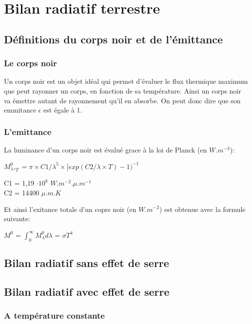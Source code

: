 \documentclass[a4paper, 12pt]{report} %
\begin{document}
\section{Bilan radiatif terrestre}
\subsection{Définitions du corps noir et de l'émittance}

\subsubsection{Le corps noir}
Un corps noir est un objet idéal qui permet d’évaluer le flux thermique maximum
que peut rayonner un corps, en fonction de sa température. Ainsi un corps noir va émettre autant de rayonnement qu'il en absorbe. On peut donc dire que son emmitance $ \epsilon$  est égale à 1.


\subsubsection{L'emittance} 

La luminance d'un corps noir est évalué grace à la loi de Planck (en $W.m^{-3}$): \vspace{\baselineskip}

\begin{center}
$M^{0}_\lambda,_T=\pi\times C1/\lambda^5\times[exp(C2/\lambda \times T)-1)^{-1}$ 

C1 = 1,19 $\cdot 10^{8}$ $W.m^{-2}.\mu.m^{-1}$\ \\
C2 = 14400 $\mu.m.K$ \\
\end{center}
Et ainsi l'exitance totale d'un coprs noir (en $W.m^{-2}$) est obtenue avec la formule suivante:

\hfil $M^{0}$ = $\int_{0}^{\infty} M^{0}_\lambda d\lambda$ = $\sigma T^{4}$ 

\par

\subsection{Bilan radiatif sans effet de serre} 
\subsection{Bilan radiatif avec effet de serre}
\subsubsection{A température constante}
\end{document}
